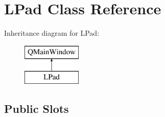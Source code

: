 \hypertarget{class_l_pad}{}\section{L\+Pad Class Reference}
\label{class_l_pad}
Inheritance diagram for L\+Pad\+:\begin{figure}[H]
\begin{center}
\leavevmode
\includegraphics[height=2.000000cm]{class_l_pad}
\end{center}
\end{figure}
\subsection*{Public Slots}
